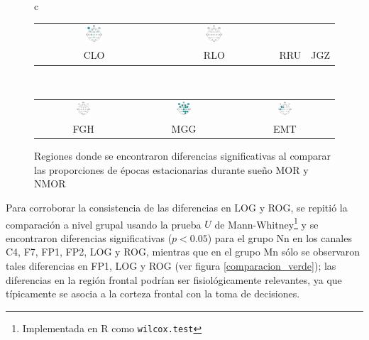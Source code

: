 \begin{figure}
\begin{tabular}{c}
\begin{tabular}{cccc}
\includegraphics[width=0.15\textwidth]{./img_diagramas/cabecita_RRU.pdf} &
\includegraphics[width=0.15\textwidth]{./img_diagramas/cabecita_JGZ.pdf} \\
CLO & RLO & RRU & JGZ
\end{tabular}
\\
\begin{tabular}{ccc}
\includegraphics[width=0.15\textwidth]{./img_diagramas/cabecita_FGH.pdf} &
\includegraphics[width=0.15\textwidth]{./img_diagramas/cabecita_MGG.pdf} &
\includegraphics[width=0.15\textwidth]{./img_diagramas/cabecita_EMT.pdf} \\
FGH & MGG & EMT
\end{tabular}
\end{tabular}
\caption{Regiones donde se encontraron diferencias significativas al comparar las proporciones de 
épocas estacionarias durante sueño MOR y NMOR}
\label{cabecitas_munchas}
\end{figure}

Para corroborar la consistencia de las diferencias en LOG y ROG, se repitió la comparación a nivel 
grupal usando la prueba $U$ de  Mann-Whitney\footnote{Implementada en R como \texttt{wilcox.test}}
y se encontraron diferencias significativas ($p<0.05$) para el grupo Nn en los canales C4, F7, FP1, 
FP2, LOG y ROG, mientras que en el grupo Mn sólo se observaron tales diferencias en FP1, LOG y ROG 
(ver figura \ref{comparacion_verde});
las diferencias en la región frontal podrían ser fisiológicamente relevantes, ya que típicamente se 
asocia a la corteza frontal con la toma de decisiones.

